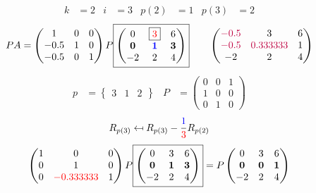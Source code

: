 \documentclass[pdf]{beamer}
\begin{document}
\begin{frame}{}\begin{align*} k &= 2 & i &= 3 & p(2) &= 1 & p(3) &= 2\end{align*} $$PA=\begin{pmatrix}1&0&0\\-0.5&1&0\\-0.5&0&1\end{pmatrix} P \boxed{\begin{pmatrix}0&\boxed{{\color{red}3}}&6\\\mathbf{0}&\mathbf{{\color{blue}1}}&\mathbf{3}\\-2&2&4\end{pmatrix}} \quad\quad \begin{pmatrix}{\color{purple}-0.5}&3&6\\{\color{purple}-0.5}&{\color{purple}0.333333}&1\\-2&2&4\end{pmatrix}$$ \begin{align*} p&= \begin{Bmatrix}3&1&2\end{Bmatrix} & P&= \begin{pmatrix}0&0&1\\1&0&0\\0&1&0\end{pmatrix} \end{align*} $$R_{p(3)} \mapsfrom R_{p(3)} - \frac{{\color{blue}1}}{{\color{red}3}} R_{p(2)}$$ $$ \begin{pmatrix}1&0&0\\0&1&0\\0&{\color{red}-0.333333}&1\end{pmatrix} P \boxed{\begin{pmatrix}0&3&6\\\mathbf{0}&\mathbf{1}&\mathbf{3}\\-2&2&4\end{pmatrix}} = P \begin{pmatrix}0&3&6\\\mathbf{0}&\mathbf{0}&\mathbf{1}\\-2&2&4\end{pmatrix} $$\end{frame}
\end{document}
